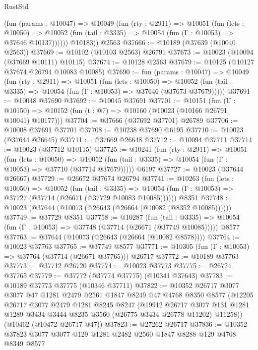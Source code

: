 \begin{lexlean}{RustStd}
\begin{coremodule}
          (fun (params : @10047) =>
          @10049
            (fun (rty : @2911) =>
            @10051
              (fun (lets : @10050) =>
              @10052 (fun (tail : @3335) => @10054 (fun (Γ : @10053) => @37646 @10137))))))
        @10183))
    @2563
@37666 := @10189 (@37639 (@10040 @2563))
@37669 := @10102 (@10103 @2563) @26791
@37673 := @10023 (@10094 (@37669 @10111) @10115)
@37674 := @10128 @2563
@37679 := @10125 (@10127 @37674 @26794 @10083 @10085)
@37690 := fun (params : @10047) =>
  @10049
    (fun (rty : @2911) =>
    @10051
      (fun (lets : @10050) =>
      @10052 (fun (tail : @3335) => @10054 (fun (Γ : @10053) => @37646 (@37673 @37679)))))
@37691 := @10048 @37690
@37692 := @10045 @37691
@37701 := @10151
    (fun (U : @10150) => @10152 (fun (t : @7) => @10160 (@10023 (@10166 @26791 @10041) @10177)))
@37704 := @37666 (@37692 @37701) @26789
@37706 := @10008 @37691 @37701
@37708 := @10238 @37690 @6195
@37710 := @10023 (@37644 @26645)
@37711 := @37669 @26648
@37712 := @10094 @37711
@37714 := @10023 (@37712 @10115)
@37725 := @10241
    (fun (rty : @2911) =>
    @10051
      (fun (lets : @10050) =>
      @10052 (fun (tail : @3335) => @10054 (fun (Γ : @10053) => @37710 (@37714 @37679)))))
    @6197
@37727 := @10023 (@37644 @26667)
@37729 := @26672 @37674 @26794
@37741 := @10263
    (fun (lets : @10050) =>
    @10052
      (fun (tail : @3335) =>
      @10054 (fun (Γ : @10053) => @37727 (@37714 (@26671 (@37729 @10083 @10085))))))
    @8351
@37748 := @10023 (@37644 (@10073 (@26643 (@26664 (@10082 (@8352 @10085))))))
@37749 := @37729 @8351
@37758 := @10287
    (fun (tail : @3335) => @10054 (fun (Γ : @10053) => @37748 (@37714 (@26671 (@37749 @10085)))))
    @8577
@37763 := @37644 (@10073 (@26643 (@26664 (@10082 @8578))))
@37764 := @10023 @37763
@37765 := @37749 @8577
@37771 := @10305 (fun (Γ : @10053) => @37764 (@37714 (@26671 @37765))) @26717
@37772 := @10189 @37763
@37773 := @37712 @26720
@37774 := @10023 @37773
@37775 := @26724 @37765
@37779 := @37772 (@37774 @37775) (@10341 @37643)
@37783 := @10189 @37773 @37775 (@10346 @37711)
@37822 := @10352
    @26717
    @3077
    @3077
    @47
    @1281
    @2479
    @2561
    @1847
    @8249
    @47
    @4768
    @8350
    @8577
    (@12205
      @26717
      @3077
      @2479
      @1281
      @8245
      @8247
      (@19912
        @26717
        @3077
        @131
        @1281
        @1289
        @3434
        @3444
        @8235
        @3560
        (@26775 @3434 @26778 @11202)
        @11258))
    (@10462 (@10472 @26717 @47))
@37823 := @27262 @26717
@37836 := @10352 @37823 @3077 @3077 @129 @1281 @2482 @2560 @1847 @8288 @129 @4768 @8349 @8577

\end{coremodule}
\end{lexlean}
